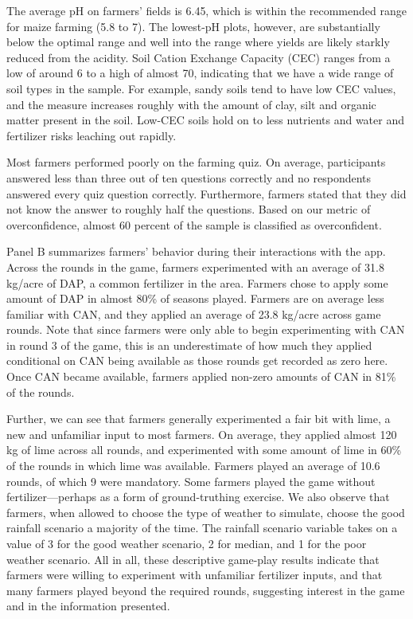 \documentclass[12pt,letterpaper]{article}
\begin{document}
The average pH on farmers' fields is 6.45, which is within the recommended range for maize farming (5.8 to 7). The lowest-pH plots, however, are substantially below the optimal range and well into the range where yields are likely starkly reduced from the acidity. Soil Cation Exchange Capacity (CEC) ranges from a low of around 6 to a high of almost 70, indicating that we have a wide range of soil types in the sample. For example, sandy soils tend to have low CEC values, and the measure increases roughly with the amount of clay, silt and organic matter present in the soil. Low-CEC soils hold on to less nutrients and water and fertilizer risks leaching out rapidly. 

Most farmers performed poorly on the farming quiz. On average, participants answered less than three out of ten questions correctly and no respondents answered every quiz question correctly. Furthermore, farmers stated that they did not know the answer to roughly half the questions. Based on our metric of overconfidence, almost 60 percent of the sample is classified as overconfident. 

Panel B summarizes farmers' behavior during their interactions with the app. Across the rounds in the game, farmers experimented with an average of 31.8 kg/acre of DAP, a common fertilizer in the area. Farmers chose to apply some amount of DAP in almost 80\% of seasons played. Farmers are on average less familiar with CAN, and they applied an average of 23.8 kg/acre across game rounds. Note that since farmers were only able to begin experimenting with CAN in round 3 of the game, this is an underestimate of how much they applied conditional on CAN being available as those rounds get recorded as zero here. Once CAN became available, farmers applied non-zero amounts of CAN in 81\% of the rounds. 

Further, we can see that farmers generally experimented a fair bit with lime, a new and unfamiliar input to most farmers. On average, they applied almost 120 kg of lime across all rounds, and experimented with some amount of lime in 60\% of the rounds in which lime was available. Farmers played an average of 10.6 rounds, of which 9 were mandatory. Some farmers played the game without fertilizer---perhaps as a form of ground-truthing exercise. We also observe that farmers, when allowed to choose the type of weather to simulate, choose the good rainfall scenario a majority of the time. The rainfall scenario variable takes on a value of 3 for the good weather scenario, 2 for median, and 1 for the poor weather scenario. All in all, these descriptive game-play results indicate that farmers were willing to experiment with unfamiliar fertilizer inputs, and that many farmers played beyond the required rounds, suggesting interest in the game and in the information presented.
\end{document}
